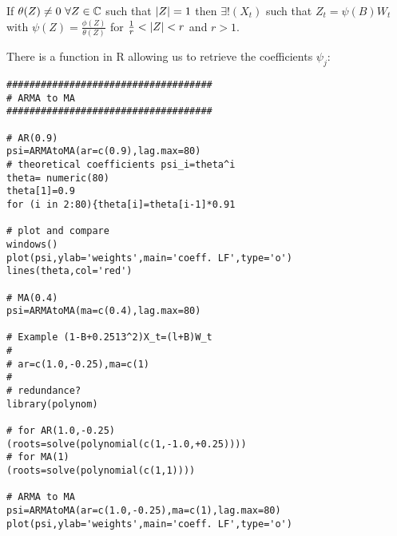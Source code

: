 \begin{theorem}
    If $\theta(Z)\ne0\ \forall Z\in\mathbb{C}$ such that $\left|Z\right|=1$ then $\exists!(X_t)$ such that $Z_t=\psi(B)W_t$ with $\psi(Z)=\frac{\phi(Z)}{\theta(Z)}$ for $\frac{1}{r}<\left|Z\right|<r$ and $r>1$.
\end{theorem}

\begin{example}
    There is a function in R allowing us to retrieve the coefficients $\psi_j$:
    \begin{verbatim}
#################################### 
# ARMA to MA
####################################

# AR(0.9)
psi=ARMAtoMA(ar=c(0.9),lag.max=80)
# theoretical coefficients psi_i=theta^i 
theta= numeric(80)
theta[1]=0.9
for (i in 2:80){theta[i]=theta[i-1]*0.91

# plot and compare
windows()
plot(psi,ylab='weights',main='coeff. LF',type='o') 
lines(theta,col='red')

# MA(0.4) 
psi=ARMAtoMA(ma=c(0.4),lag.max=80)

# Example (1-B+0.2513^2)X_t=(l+B)W_t
#
# ar=c(1.0,-0.25),ma=c(1)
#
# redundance?
library(polynom)

# for AR(1.0,-0.25)
(roots=solve(polynomial(c(1,-1.0,+0.25)))) 
# for MA(1)
(roots=solve(polynomial(c(1,1))))

# ARMA to MA
psi=ARMAtoMA(ar=c(1.0,-0.25),ma=c(1),lag.max=80) 
plot(psi,ylab='weights',main='coeff. LF',type='o')
    \end{verbatim}
\end{example}

